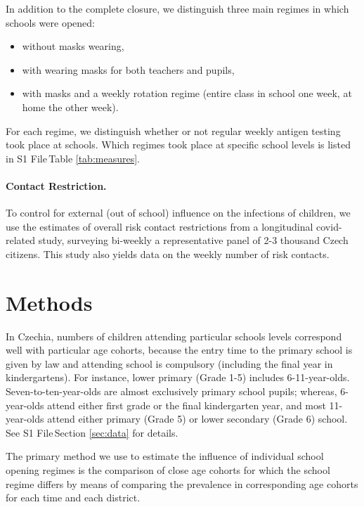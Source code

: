 \documentclass[fleqn,10pt]{wlscirep}
\def\supfile{S1 File\,}
\begin{document}
In addition to the complete closure, we distinguish three main regimes in which schools were opened: 
\begin{itemize}
\item without masks wearing, 
\item with wearing masks for both teachers and pupils, 
\item with masks and a weekly rotation regime (entire class in school one week, at home the other week). 
\end{itemize}
For each regime, we distinguish whether or not regular weekly antigen testing took place at schools. Which regimes took place at specific school levels is listed in \supfile Table \ref{tab:measures}. 

\paragraph*{Contact Restriction.}

To control for external (out of school) influence on the infections of children, we use the estimates of overall risk contact restrictions \cite{paqcovid} from a longitudinal covid-related study, surveying bi-weekly a representative panel of 2-3 thousand Czech citizens. This study also yields data on the weekly number of risk contacts.

\section*{Methods}


In Czechia, numbers of children attending particular schools levels correspond well with particular age cohorts, because the entry time to the primary school is given by law and attending school is compulsory (including the final year in kindergartens). For instance, lower primary (Grade 1-5) includes 6-11-year-olds. Seven-to-ten-year-olds are almost exclusively primary school pupils; whereas, 6-year-olds attend either first grade or the final kindergarten year, and most 11-year-olds attend either primary (Grade 5) or lower secondary (Grade 6) school. See \supfile Section \ref{sec:data} for details.

The primary method we use to estimate the influence of individual school opening regimes is the comparison of close age cohorts for which the school regime differs by means of comparing the prevalence in corresponding age cohorts for each time and each district.
\end{document}
